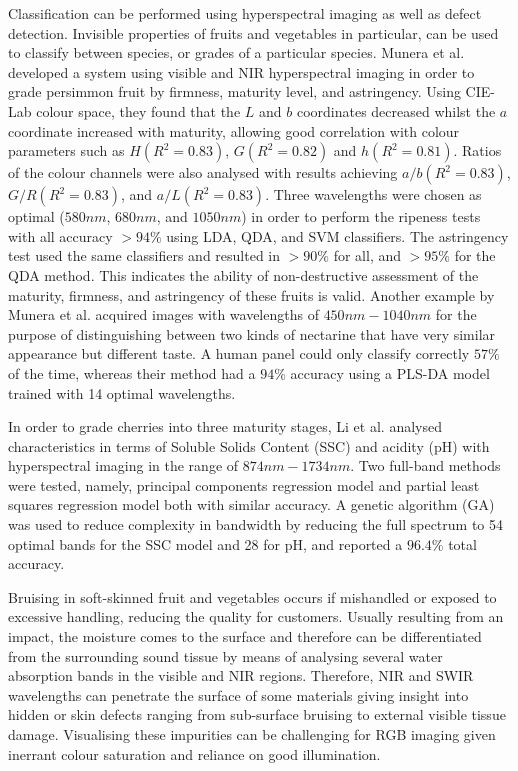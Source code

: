 \documentclass[fleqn,twoside,12pt]{report}
\begin{document}
Classification can be performed using hyperspectral imaging as well as defect detection. Invisible properties of fruits and vegetables in particular, can be used to classify between species, or grades of a particular species. Munera et al.\cite{munera} developed a system using visible and NIR hyperspectral imaging in order to grade persimmon fruit by firmness, maturity level, and astringency. Using CIE-Lab colour space, they found that the $L$ and $b$ coordinates decreased whilst the $a$ coordinate increased with maturity, allowing good correlation with colour parameters such as $H(R^2 = 0.83)$, $G(R^2 = 0.82)$ and $h(R^2 = 0.81)$. Ratios of the colour channels were also analysed with results achieving $a/b(R^2 = 0.83)$, $G/R(R^2 = 0.83)$, and $a/L(R^2 = 0.83)$. Three wavelengths were chosen as optimal ($580nm$, $680nm$, and $1050nm$) in order to perform the ripeness tests with all accuracy $>94\%$ using LDA, QDA, and SVM classifiers. The astringency test used the same classifiers and resulted in $>90\%$ for all, and $>95\%$ for the QDA method. This indicates the ability of non-destructive assessment of the maturity, firmness, and astringency of these fruits is valid. Another example by Munera et al.\cite{munera2} acquired images with wavelengths of $450nm-1040nm$ for the purpose of distinguishing between two kinds of nectarine that have very similar appearance but different taste. A human panel could only classify correctly $57\%$ of the time, whereas their method had a $94\%$ accuracy using a PLS-DA model trained with 14 optimal wavelengths. 

In order to grade cherries into three maturity stages, Li et al.\cite{li} analysed characteristics in terms of Soluble Solids Content (SSC) and acidity (pH) with hyperspectral imaging in the range of $874nm-1734nm$. Two full-band methods were tested, namely, principal components regression model and partial least squares regression model both with similar accuracy. A genetic algorithm (GA) was used to reduce complexity in bandwidth by reducing the full spectrum to 54 optimal bands for the SSC model and 28 for pH, and reported a $96.4\%$ total accuracy.  


Bruising in soft-skinned fruit and vegetables occurs if mishandled or exposed to excessive handling, reducing the quality for customers. Usually resulting from an impact, the moisture comes to the surface and therefore can be differentiated from the surrounding sound tissue by means of analysing several water absorption bands in the visible and NIR regions. Therefore, NIR and SWIR wavelengths can penetrate the surface of some materials giving insight into hidden or skin defects ranging from sub-surface bruising to external visible tissue damage. Visualising these impurities can be challenging for RGB imaging given inerrant colour saturation and reliance on good illumination. 
\end{document}
